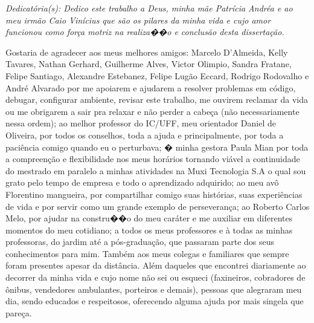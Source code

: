 \cleardoublepage
\thispagestyle{empty}
\vspace*{200mm}

\begin{flushright}
{\em 
Dedicatória(s): Dedico este trabalho a Deus, minha mãe Patrícia Andréa e ao meu irmão Caio Vinícius que são os pilares da minha vida e cujo amor funcionou como força motriz na realiza��o e conclusão desta dissertação.
}
\end{flushright}
\newpage


\hspace{5mm}
Gostaria de agradecer aos meus melhores amigos: Marcelo D'Almeida, Kelly Tavares, Nathan Gerhard, Guilherme Alves, Victor Olimpio, Sandra Fratane, Felipe Santiago, Alexandre Estebanez, Felipe Lugão Eccard, Rodrigo Rodovalho e André Alvarado por me apoiarem e ajudarem a resolver problemas em código, debugar, configurar ambiente, revisar este trabalho, me ouvirem reclamar da vida ou me obrigarem a sair pra relaxar e não perder a cabeça (não necessariamente nessa ordem); ao melhor professor do IC/UFF, meu orientador Daniel de Oliveira, por todos os conselhos, toda a ajuda e principalmente, por toda a paciência comigo quando eu o perturbava; � minha gestora Paula Mian por toda a compreenção e flexibilidade nos meus horários tornando viável a continuidade do mestrado em paralelo a minhas atividades na Muxi Tecnologia S.A o qual sou grato pelo tempo de empresa e todo o aprendizado adquirido; ao meu avô Florentino mangueira, por compartilhar comigo suas histórias, suas experiências de vida e por servir como um grande exemplo de perseverança; ao Roberto Carlos Melo, por ajudar na constru��o do meu caráter e me auxiliar em diferentes momentos do meu cotidiano; a todos os meus professores e à todas as minhas professoras, do jardim até a pós-graduação, que passaram parte dos seus conhecimentos para mim. Também aos meus colegas e familiares que sempre foram presentes apesar da distância. Além daqueles que encontrei diariamente ao decorrer da minha vida e cujo nome não sei ou esqueci (faxineiros, cobradores de ônibus, vendedores ambulantes, porteiros e demais), pessoas que alegraram meu dia, sendo educados e respeitosos, oferecendo alguma ajuda por mais singela que pareça.

